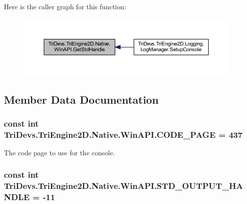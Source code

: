 Here is the caller graph for this function\-:\nopagebreak
\begin{figure}[H]
\begin{center}
\leavevmode
\includegraphics[width=350pt]{class_tri_devs_1_1_tri_engine2_d_1_1_native_1_1_win_a_p_i_a7617bf77270291625f566cf21294d518_icgraph}
\end{center}
\end{figure}




\subsection{Member Data Documentation}
\hypertarget{class_tri_devs_1_1_tri_engine2_d_1_1_native_1_1_win_a_p_i_a83ef0d2539e95cc640d8e1f1216beec5}{
\subsubsection[{C\-O\-D\-E\-\_\-\-P\-A\-G\-E}]{\setlength{\rightskip}{0pt plus 5cm}const int Tri\-Devs.\-Tri\-Engine2\-D.\-Native.\-Win\-A\-P\-I.\-C\-O\-D\-E\-\_\-\-P\-A\-G\-E = 437}}\label{class_tri_devs_1_1_tri_engine2_d_1_1_native_1_1_win_a_p_i_a83ef0d2539e95cc640d8e1f1216beec5}


The code page to use for the console. 

\hypertarget{class_tri_devs_1_1_tri_engine2_d_1_1_native_1_1_win_a_p_i_a19ebb40d1edf46781ea0fdf4a9c94e8b}{
\subsubsection[{S\-T\-D\-\_\-\-O\-U\-T\-P\-U\-T\-\_\-\-H\-A\-N\-D\-L\-E}]{\setlength{\rightskip}{0pt plus 5cm}const int Tri\-Devs.\-Tri\-Engine2\-D.\-Native.\-Win\-A\-P\-I.\-S\-T\-D\-\_\-\-O\-U\-T\-P\-U\-T\-\_\-\-H\-A\-N\-D\-L\-E = -\/11}}\label{class_tri_devs_1_1_tri_engine2_d_1_1_native_1_1_win_a_p_i_a19ebb40d1edf46781ea0fdf4a9c94e8b}


